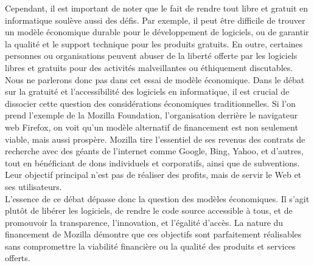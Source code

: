 

Cependant, il est important de noter que le fait de rendre tout libre et gratuit en informatique soulève aussi des défis. Par exemple, il peut être difficile de trouver un modèle économique durable pour le développement de logiciels, ou de garantir la qualité et le support technique pour les produits gratuits. En outre, certaines personnes ou organisations peuvent abuser de la liberté offerte par les logiciels libres et gratuits pour des activités malveillantes ou éthiquement discutables.\\
Nous ne parlerons donc pas dans cet essai de modèle économique. Dans le débat sur la gratuité et l'accessibilité des logiciels en informatique, il est crucial de dissocier cette question des considérations économiques traditionnelles. Si l'on prend l'exemple de la Mozilla Foundation, l'organisation derrière le navigateur web Firefox, on voit qu'un modèle alternatif de financement est non seulement viable, mais aussi prospère. Mozilla tire l'essentiel de ses revenus des contrats de recherche avec des géants de l'internet comme Google, Bing, Yahoo, et d'autres, tout en bénéficiant de dons individuels et corporatifs, ainsi que de subventions. Leur objectif principal n'est pas de réaliser des profits, mais de servir le Web et ses utilisateurs.\\

L'essence de ce débat dépasse donc la question des modèles économiques. Il s'agit plutôt de libérer les logiciels, de rendre le code source accessible à tous, et de promouvoir la transparence, l'innovation, et l'égalité d'accès. La nature du financement de Mozilla démontre que ces objectifs sont parfaitement réalisables sans compromettre la viabilité financière ou la qualité des produits et services offerts.
